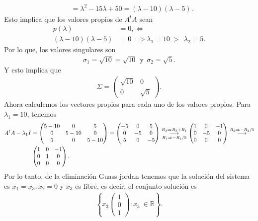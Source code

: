 \documentclass[11pt,letterpaper]{article}
\newcommand{\mR}{\mathbb{R}}
\newcommand{\grstep}[2][\relax]{%
   \ensuremath{\mathrel{
       {\mathop{\longrightarrow}\limits^{#2\mathstrut}_{
                                     \begin{subarray}{l} #1 \end{subarray}}}}}}
\begin{document}
\begin{enumerate}
\begin{align*}
&= \lambda^2-15\lambda+50=(\lambda-10)(\lambda-5).
\end{align*}
Esto implica que los valores propios de $A^tA$ sean
\begin{align*}
p(\lambda)&=0,\Leftrightarrow\\
(\lambda-10)(\lambda-5)&=0\ \ \ \Rightarrow \lambda_1=10\ >\  \ \lambda_2=5.
\end{align*}
Por lo que, los valores singulares son
\begin{align*}
\sigma_1=\sqrt{10}=\sqrt{10} \ \ \text{y} \ \ \sigma_2=\sqrt{5}.  
\end{align*}
Y esto implica que 
\begin{align*}
\Sigma = \begin{pmatrix}
\sqrt{10} & 0 \\
0 & \sqrt{5} 
\end{pmatrix}.
\end{align*}
Ahora calculemos los vectores propios para cada uno de los valores propios. Para $\lambda_1=10$, tenemos 
\begin{align*}
A^tA-\lambda_1I&=\begin{pmatrix}
5-10 & 0 & 5\\
0& 5-10 & 0\\
5 & 0 & 5-10
\end{pmatrix}=\begin{pmatrix}
-5 & 0 & 5\\
0& -5 & 0\\
5 & 0 & -5
\end{pmatrix}%
\grstep[R_1 \Rightarrow -R_1/5]{R_3 \Rightarrow R_3+R_1}
%
\begin{pmatrix}
1 & 0 & -1\\
0& -5 & 0\\
0 & 0 & 0
\end{pmatrix}
%
\grstep[]{R_2 \Rightarrow -R_2/5}
\\
&\begin{pmatrix}
1 & 0 & -1\\
0& 1 & 0\\
0 & 0 & 0
\end{pmatrix}.
\end{align*}
Por lo tanto, de la eliminación Guass-jordan tenemos que la solución del sistema es $x_1=x_3, x_2=0$ y $x_3$ es libre, es decir, el conjunto solución es
\begin{align*}
\left\{x_3\begin{pmatrix}
1\\
 0\\
 1
\end{pmatrix}: x_3 \ \in \mR \right\}.

\end{align*}
\end{enumerate}
\end{document}
